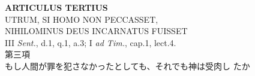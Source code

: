 \documentclass[paper=a4paper,fontsize=10pt,jafontsize=9pt,titlepage]{jlreq}
\begin{document}
\newpage
{}
{}
\setcounter{section}{3}
\setcounter{subsection}{0}




\begin{center}
 {\Large {\bfseries ARTICULUS TERTIUS}}\\
 {\large UTRUM, SI HOMO NON PECCASSET,\\ NIHILOMINUS DEUS INCARNATUS FUISSET}\\
 {\footnotesize III {\itshape Sent.}, d.1, q.1, a.3; I {\itshape ad
 Tim.}, cap.1, lect.4.}\\
 {\Large 第三項\\もし人間が罪を犯さなかったとしても、それでも神は受肉し
 たか}
\end{center}
\end{document}
